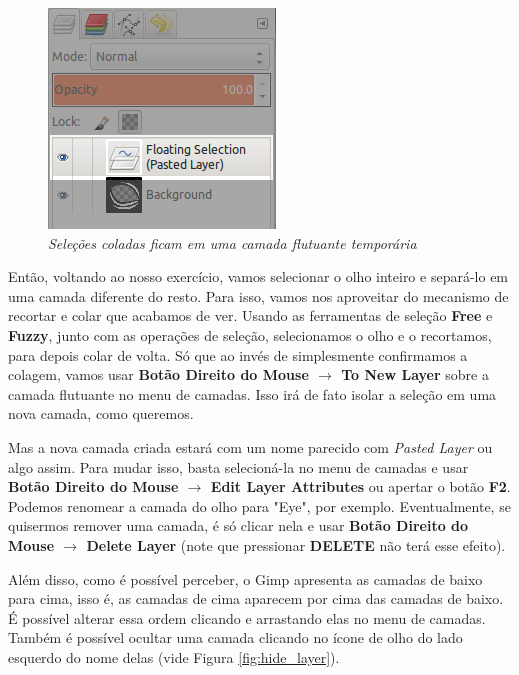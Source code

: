 \documentclass[12pt,onecolumn]{article}
\begin{document}
    \begin{figure}[H]
      \centering
      \includegraphics[width=.5\textwidth]{screenshots/05-pasted_layer.png}
      \caption{
        \footnotesize
        \it
        Seleções coladas ficam em uma camada flutuante temporária
      }
      \label{fig:pasted_layer}
    \end{figure}
    
    Então, voltando ao nosso exercício, vamos selecionar o olho inteiro e
    separá-lo em uma camada diferente do resto. Para isso, vamos nos aproveitar
    do mecanismo de recortar e colar que acabamos de ver. Usando as ferramentas
    de seleção {\bf Free} e {\bf Fuzzy}, junto com as operações de seleção,
    selecionamos o olho e o recortamos, para depois colar de volta. Só que ao
    invés de simplesmente confirmamos a colagem, vamos usar {\bf Botão Direito
    do Mouse $\rightarrow$ To New Layer} sobre a camada flutuante no menu de
    camadas. Isso irá de fato isolar a seleção em uma nova camada, como
    queremos.
    
    Mas a nova camada criada estará com um nome parecido com {\it Pasted Layer}
    ou algo assim. Para mudar isso, basta selecioná-la no menu de camadas e usar
    {\bf Botão Direito do Mouse $\rightarrow$ Edit Layer Attributes} ou apertar
    o botão {\bf F2}. Podemos renomear a camada do olho para "Eye", por exemplo.
    Eventualmente, se quisermos remover uma camada, é só clicar nela e usar
    {\bf Botão Direito do Mouse $\rightarrow$ Delete Layer} (note que pressionar
    {\bf DELETE} não terá esse efeito).
    
    Além disso, como é possível perceber, o Gimp apresenta as camadas de baixo
    para cima, isso é, as camadas de cima aparecem por cima das camadas de
    baixo. É possível alterar essa ordem clicando e arrastando elas no menu de
    camadas. Também é possível ocultar uma camada clicando no ícone de olho do
    lado esquerdo do nome delas (vide Figura \ref{fig:hide_layer}).
    
\end{document}

